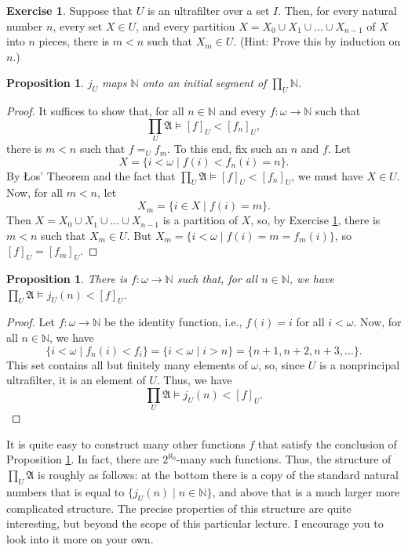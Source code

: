 \documentclass[a4paper]{memoir}
\newtheorem{proposition}[theorem]{Proposition}
\theoremstyle{definition}
\newtheorem{exercise}[theorem]{Exercise}
\newcommand{\bb}{\mathbb}
\newcommand{\ra}{\rightarrow}
\begin{document}
\begin{exercise} \label{exercise: uf_partition}
  Suppose that $U$ is an ultrafilter over a set $I$. Then, for every natural number $n$, every 
  set $X \in U$, and every partition $X = X_0 \cup X_1 \cup \ldots \cup X_{n-1}$ of $X$ into 
  $n$ pieces, there is $m < n$ such that $X_m \in U$. (Hint: Prove this by induction on $n$.)
\end{exercise}

\begin{proposition}
  $j_U$ maps $\bb{N}$ onto an initial segment of $\prod_U \bb{N}$. 
\end{proposition}

\begin{proof}
  It suffices to show that, for all $n \in \bb{N}$ and every $f : \omega \ra \bb{N}$ such 
  that 
  \[
    \prod_U \mathfrak{A} \models [f]_U < [f_n]_U,
  \]
  there is $m < n$ such that $f =_U f_m$. To this end, fix such an $n$ and $f$. 
  Let 
  \[
    X = \{i < \omega \mid f(i) < f_n(i) = n\}.
  \]
  By \L os' Theorem and the fact that $\prod_U \mathfrak{A} \models [f]_U < [f_n]_U$, 
  we must have $X \in U$. Now, for all $m < n$, let 
  \[
    X_m = \{i \in X \mid f(i) = m\}.
  \]
  Then $X = X_0 \cup X_1 \cup \ldots \cup X_{n-1}$ is a partition of $X$, so, by Exercise 
  \ref{exercise: uf_partition}, there is $m < n$ such that $X_m \in U$. But 
  $X_m = \{i < \omega \mid f(i) = m = f_m(i)\}$, so $[f]_U = [f_m]_U$.
\end{proof}

\begin{proposition} \label{prop: id_f}
  There is $f : \omega \ra \bb{N}$ such that, for all $n \in \bb{N}$, we have 
  $\prod_U \mathfrak{A} \models j_U(n) < [f]_U$.
\end{proposition}

\begin{proof}
  Let $f : \omega \ra \bb{N}$ be the identity function, i.e., $f(i) = i$ for all $i < \omega$. 
  Now, for all $n \in \bb{N}$, we have
  \[
    \{i < \omega \mid f_n(i) < f_i\} = \{i < \omega \mid i > n\} = \{n+1, n+2, n+3, \ldots\}.
  \]
  This set contains all but finitely many elements of $\omega$, so, since $U$ is a nonprincipal 
  ultrafilter, it is an element of $U$. Thus, we have 
  \[
    \prod_U \mathfrak{A} \models j_U(n) < [f]_U.
  \]
\end{proof}

It is quite easy to construct many other functions $f$ that satisfy the conclusion of 
Proposition \ref{prop: id_f}. In fact, there are $2^{\aleph_0}$-many such functions. 
Thus, the structure of $\prod_U \mathfrak{A}$ is roughly as follows: at the bottom there is 
a copy of the standard natural numbers that is equal to 
$\{j_U(n) \mid n \in \bb{N}\}$, and above that is a much larger more complicated structure. 
The precise properties of this structure are quite interesting, but beyond the scope of this 
particular lecture. I encourage you to look into it more on your own.
\end{document}
